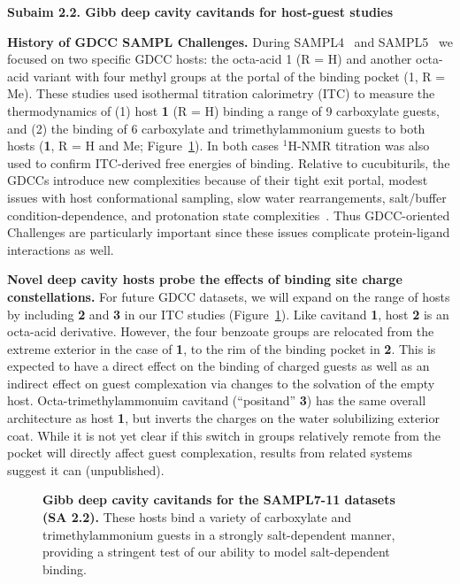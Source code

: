 \documentclass[11pt]{article}
\begin{document}
\textbf{Subaim 2.2. Gibb deep cavity cavitands for host-guest studies} 

{\bf History of GDCC SAMPL Challenges.} During SAMPL4~\cite{gibb_binding_2013} and SAMPL5~\cite{sullivan_binding_2016} we focused on two specific GDCC hosts: the octa-acid 1 (R = H) and another octa-acid variant with four methyl groups at the portal of the binding pocket (1, R = Me). 
These studies used isothermal titration calorimetry (ITC) to measure the thermodynamics of (1) host {\bf 1} (R = H) binding a range of 9 carboxylate guests,
and (2) the binding of 6 carboxylate and trimethylammonium guests to both hosts ({\bf 1}, R = H and Me; Figure~\ref{figure:gdccs}).  
In both cases $^1$H-NMR titration was also used to confirm ITC-derived free energies of binding.  
Relative to cucubiturils, the GDCCs introduce new complexities because of their tight exit portal, modest issues with host conformational sampling, slow water rearrangements, salt/buffer condition-dependence, and protonation state complexities~\cite{Mobley:2017:AnnualReviewofBiophysics, yin_overview_2016}.
Thus GDCC-oriented Challenges are particularly important since these issues complicate protein-ligand interactions as well.

{\bf Novel deep cavity hosts probe the effects of binding site charge constellations.} 
For future GDCC datasets, we will expand on the range of hosts by including {\bf 2} and {\bf 3} in our ITC studies (Figure~\ref{figure:gdccs}).  
Like cavitand {\bf 1}, host {\bf 2} is an octa-acid derivative.  
However, the four benzoate groups are relocated from the extreme exterior in the case of {\bf 1}, to the rim of the binding pocket in {\bf 2}.  
This is expected to have a direct effect on the binding of charged guests as well as an indirect effect on guest complexation via changes to the solvation of the empty host.  
Octa-trimethylammonuim cavitand (``positand'' {\bf 3}) has the same overall architecture as host {\bf 1}, but inverts the charges on the water solubilizing exterior coat.  
While it is not yet clear if this switch in groups relatively remote from the pocket will directly affect guest complexation, results from related systems suggest it can (unpublished). 

\begin{figure}[h]
\begin{centering}

\end{centering}

\vspace{-0.1in}
\caption{\footnotesize {\bf Gibb deep cavity cavitands for the SAMPL7-11 datasets (SA 2.2).} These hosts bind a variety of carboxylate and trimethylammonium guests in a strongly salt-dependent manner, providing a stringent test of our ability to model salt-dependent binding.
\label{figure:gdccs}
\vspace{-0.2in}
}
\end{figure}
\end{document}
